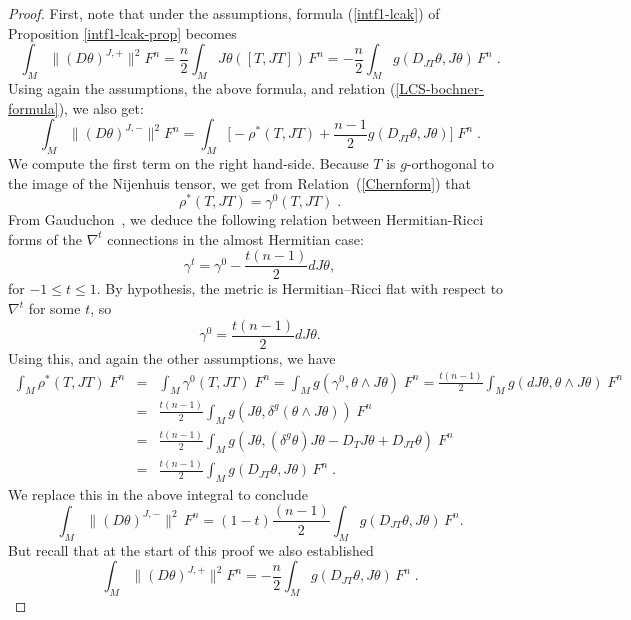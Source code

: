 \documentclass[a4paper,11pt]{amsart}
\theoremstyle{definition}
\renewcommand{\[}{\begin{equation*}}
\renewcommand{\]}{\end{equation*}}
\begin{document}
\begin{proof} First, note that under the assumptions, formula (\ref{intf1-lcak}) of Proposition \ref{intf1-lcak-prop} becomes
$$ \int_M  \|(D\theta)^{J,+}\|^2 F^n = \frac{n}{2}\int_M J\theta([T,JT]) \,F^n = - \frac{n}{2}\int_M g(D_{JT}\theta,J\theta) \, F^n \; .$$
Using again the assumptions, the above formula, and relation (\ref{LCS-bochner-formula}), we also get: 
$$ \int_M  \|(D\theta)^{J,-}\|^2 F^n = \int_M \Big[ -\rho^{\ast}(T, JT) + \frac{n-1}{2} g(D_{JT}\theta,J\theta) \Big] \; F^n \; .$$
We compute the first term on the right hand-side. Because $T$ is $g$-orthogonal to the image of the Nijenhuis tensor, we get from Relation~(\ref{Chernform}) that 
$$\rho^\ast(T,JT) = \gamma^0(T,JT) \; .$$
From Gauduchon~\cite[Remark 5]{MR1456265}, we deduce the following relation between Hermitian-Ricci forms of the $\nabla^t$ connections in the almost Hermitian case:
$$\gamma^t=\gamma^0-\frac{t(n-1)}{2}dJ\theta,$$
for $-1\leq t\leq 1.$ By hypothesis, the metric is Hermitian--Ricci flat with respect to $\nabla^t$ for some $t$, so
\begin{equation*}\label{hermitian-flat-relation}
\gamma^0=\frac{t(n-1)}{2}dJ\theta.
\end{equation*}
Using this, and again the other assumptions, we have
\begin{eqnarray*}
    \int_M \rho^\ast(T,JT) \; F^n &=& \int_M \gamma^0(T,JT) \; F^n = \int_M g\left( \gamma^0, \theta \wedge J\theta \right) \; F^n = \frac{t(n-1)}{2}\int_M g\left( dJ\theta , \theta \wedge J\theta \right) \; F^n \\
    &=& \frac{t(n-1)}{2}\int_M g\left( J\theta , \delta^g(\theta \wedge J\theta ) \right) \; F^n \\ &= & \frac{t(n-1)}{2}\int_M g\left( J\theta , (\delta^g \theta) J\theta - D_T J \theta +D_{JT} \theta \right) \; F^n \\
    & =& \frac{t(n-1)}{2}\int_M g(D_{JT}\theta,J\theta) \, F^n \; .
\end{eqnarray*}
We replace this in the above integral to conclude
\begin{equation}\label{J-anti-D-Lee}
\int_M\|\left(D\theta\right)^{J,-}\|^2\,F^n=(1-t)\frac{(n-1)}{2}\int_Mg(D_{JT}\theta,J\theta)\,F^n.
\end{equation}
But recall that at the start of this proof we also established
\begin{equation} \label{J-inv-D-Lee}
    \int_M  \|(D\theta)^{J,+}\|^2 F^n = - \frac{n}{2}\int_M g(D_{JT}\theta,J\theta) \, F^n \; .
\end{equation}

\end{proof}
\end{document}
